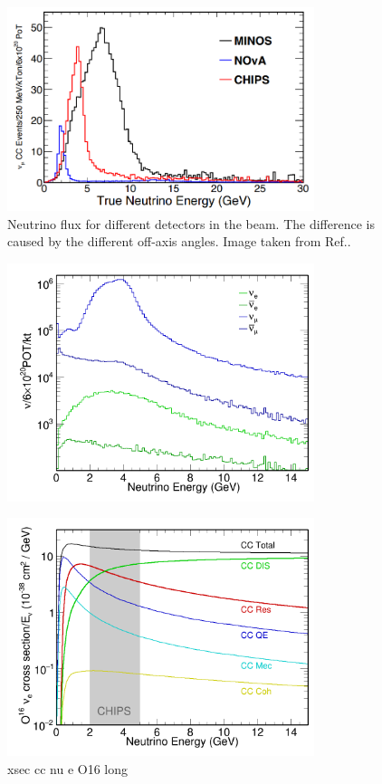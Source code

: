 \begin{figure}
    \includegraphics[width=0.8\textwidth]{diagrams/4-chips/numi_axis.png}
    \caption[Neutrino flux for different detectors in the \numi beam.]
    {Neutrino flux for different detectors in the \numi beam.
        The difference is caused by the different off-axis angles.
        Image taken from Ref.\cite{adamson2013}.}
    \label{fig:numi_axis}
\end{figure}

\begin{figure}
    \includegraphics[width=0.8\textwidth]{diagrams/4-chips/flux.png}
    \caption[flux short]
    {}
    \label{fig:flux}
\end{figure}

\begin{figure}
    \includegraphics[width=0.8\textwidth]{diagrams/4-chips/xsec_cc_nu_e_O16.png}
    \caption[xsec cc nu e O16 short]
    {xsec cc nu e O16 long}
    \label{fig:xsec_cc_nu_e_O16}
\end{figure}


